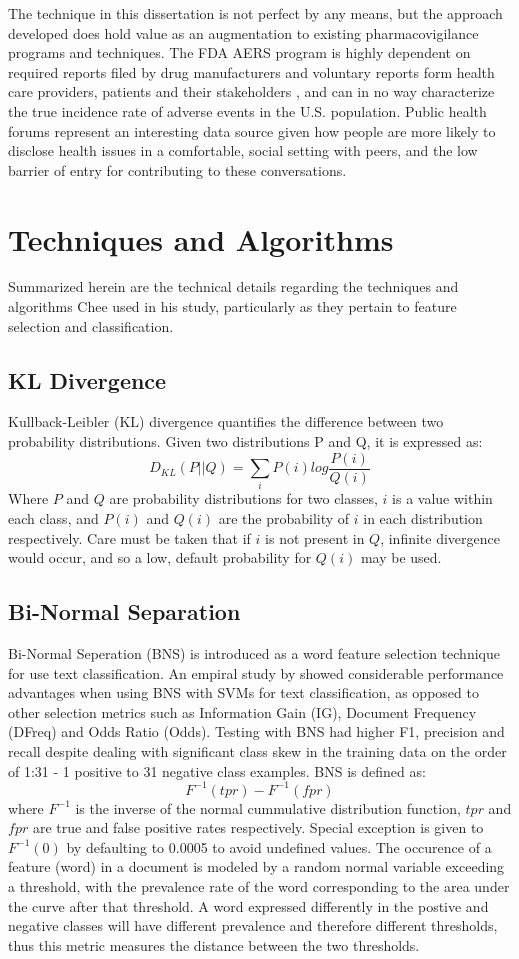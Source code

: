 \documentclass[twoside,11pt]{article}
\begin{document}
The technique in this dissertation is not perfect by any means, but the approach developed does hold value as an augmentation to existing pharmacovigilance programs and techniques. The FDA AERS program is highly dependent on required reports filed by drug manufacturers and voluntary reports form health care providers, patients and their stakeholders \citep{FDA Aers}, and can in no way characterize the true incidence rate of adverse events in the U.S. population. Public health forums represent an interesting data source given how people are more likely to disclose health issues in a comfortable, social setting with peers, and the low barrier of entry for contributing to these conversations.


\section{Techniques and Algorithms}
Summarized herein are the technical details regarding the techniques and algorithms Chee used in his study, particularly as they pertain to feature selection and classification.

\subsection{KL Divergence}
Kullback-Leibler (KL) divergence quantifies the difference between two probability distributions. Given two distributions P and Q, it is expressed as:
\[
  D_{KL}(P||Q) = \sum_{i}P(i)log\frac{P(i)}{Q(i)}
\]
Where $P$ and $Q$ are probability distributions for two classes, $i$ is a value within each class, and $P(i)$ and $Q(i)$ are the probability of $i$ in each distribution respectively. Care must be taken that if $i$ is not present in $Q$, infinite divergence would occur, and so a low, default probability for $Q(i)$ may be used.

\subsection{Bi-Normal Separation}
Bi-Normal Seperation (BNS) is introduced as a word feature selection technique for use text classification. An empiral study by \citep{Forman} showed considerable performance advantages when using BNS with SVMs for text classification, as opposed to other selection metrics such as Information Gain (IG), Document Frequency (DFreq) and Odds Ratio (Odds). Testing with BNS had higher F1, precision and recall despite dealing with significant class skew in the training data on the order of 1:31 - 1 positive to 31 negative class examples. BNS is defined as:
\[
  F^{-1}(tpr) - F^{-1}(fpr)
\]
where $F^{-1}$ is the inverse of the normal cummulative distribution function, $tpr$ and $fpr$ are true and false positive rates respectively. Special exception is given to $F^{-1}(0)$ by defaulting to 0.0005 to avoid undefined values. The occurence of a feature (word) in a document is modeled by a random normal variable exceeding a threshold, with the prevalence rate of the word corresponding to the area under the curve after that threshold. A word expressed differently in the postive and negative classes will have different prevalence and therefore different thresholds, thus this metric measures the distance between the two thresholds.
\end{document}
